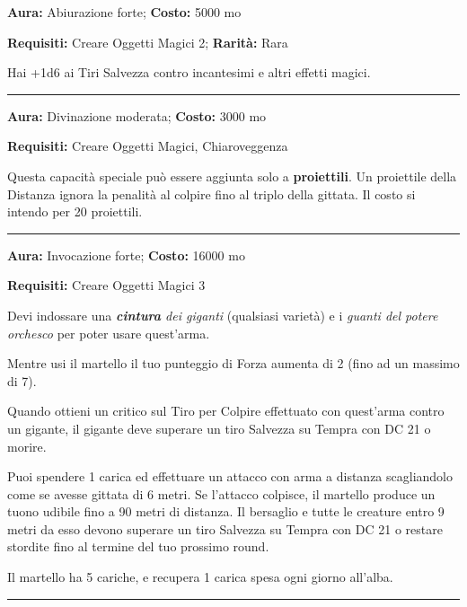 \begin{multicols}{2}
\textbf{Aura:} Abiurazione forte; \textbf{Costo:} 5000 mo

\textbf{Requisiti:} Creare Oggetti Magici 2; \textbf{Rarità:} Rara

Hai +1d6 ai Tiri Salvezza contro incantesimi e altri effetti magici.

\smallskip\noindent\rule{\linewidth}{2pt}  \hypertarget{Distanza}{}\smallskip{}\noindent\label{Distanza}

\textbf{Aura:} Divinazione moderata; \textbf{Costo:} 3000 mo

\textbf{Requisiti:} Creare Oggetti Magici, Chiaroveggenza

Questa capacità speciale può essere aggiunta solo a \textbf{proiettili}. Un proiettile della Distanza ignora la penalità al colpire fino al triplo della gittata. Il costo si intendo per 20 proiettili.

\smallskip\noindent\rule{\linewidth}{2pt}  \hypertarget{DistruttricedeiGiganti}{}\smallskip{}\noindent\label{DistruttricedeiGiganti}

\textbf{Aura:} Invocazione forte; \textbf{Costo:} 16000 mo

\textbf{Requisiti:} Creare Oggetti Magici 3

Devi indossare una \emph{\textbf{cintura} dei giganti} (qualsiasi varietà) e i \emph{guanti del potere orchesco} per poter usare quest'arma.

Mentre usi il martello il tuo punteggio di Forza aumenta di 2 (fino ad un massimo di 7).

Quando ottieni un critico sul Tiro per Colpire effettuato con quest'arma contro un gigante, il gigante deve superare un tiro Salvezza su Tempra con DC 21 o morire.

Puoi spendere 1 carica ed effettuare un attacco con arma a distanza scagliandolo come se avesse gittata di 6 metri. Se l'attacco colpisce, il martello produce un tuono udibile fino a 90 metri di distanza. Il bersaglio e tutte le creature entro 9 metri da esso devono superare un tiro Salvezza su Tempra con DC 21 o restare stordite fino al termine del tuo prossimo round.

Il martello ha 5 cariche, e recupera 1 carica spesa ogni giorno all'alba.

\smallskip\noindent\rule{\linewidth}{2pt}  \hypertarget{Distruzione}{}\smallskip{}\noindent\label{Distruzione}


\end{multicols}
